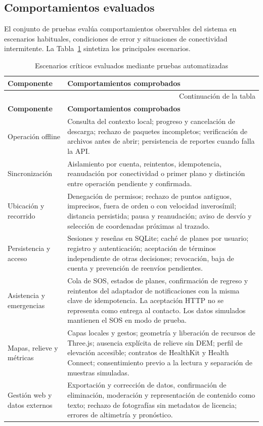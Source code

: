 \subsection{Comportamientos evaluados}

El conjunto de pruebas evalúa comportamientos observables del sistema en escenarios habituales, condiciones de error y situaciones de conectividad intermitente. La Tabla~\ref{tab:technical-validation} sintetiza los principales escenarios.

\begingroup
\small
\setlength{\tabcolsep}{4pt}
\renewcommand{\arraystretch}{1.12}
\begin{longtable}{|p{3.1cm}|p{11.1cm}|}
\caption{Escenarios críticos evaluados mediante pruebas automatizadas}\label{tab:technical-validation} \\
\hline
\textbf{Componente} & \textbf{Comportamientos comprobados} \\
\hline
\endfirsthead
\multicolumn{2}{r}{\footnotesize Continuación de la tabla} \\
\hline
\textbf{Componente} & \textbf{Comportamientos comprobados} \\
\hline
\endhead
\hline
\endfoot
\hline
\endlastfoot
Operación offline & Consulta del contexto local; progreso y cancelación de descarga; rechazo de paquetes incompletos; verificación de archivos antes de abrir; persistencia de reportes cuando falla la API. \\
\hline
Sincronización & Aislamiento por cuenta, reintentos, idempotencia, reanudación por conectividad o primer plano y distinción entre operación pendiente y confirmada. \\
\hline
Ubicación y recorrido & Denegación de permisos; rechazo de puntos antiguos, imprecisos, fuera de orden o con velocidad inverosímil; distancia persistida; pausa y reanudación; aviso de desvío y selección de coordenadas próximas al trazado. \\
\hline
Persistencia y acceso & Sesiones y reseñas en SQLite; caché de planes por usuario; registro y autenticación; aceptación de términos independiente de otras decisiones; revocación, baja de cuenta y prevención de reenvíos pendientes. \\
\hline
Asistencia y emergencias & Cola de SOS, estados de planes, confirmación de regreso y reintentos del adaptador de notificaciones con la misma clave de idempotencia. La aceptación HTTP no se representa como entrega al contacto. Los datos simulados mantienen el SOS en modo de prueba. \\
\hline
Mapas, relieve y métricas & Capas locales y gestos; geometría y liberación de recursos de Three.js; ausencia explícita de relieve sin DEM; perfil de elevación accesible; contratos de HealthKit y Health Connect; consentimiento previo a la lectura y separación de muestras simuladas. \\
\hline
Gestión web y datos externos & Exportación y corrección de datos, confirmación de eliminación, moderación y representación de contenido como texto; rechazo de fotografías sin metadatos de licencia; errores de altimetría y pronóstico. \\
\hline
\end{longtable}
\endgroup

